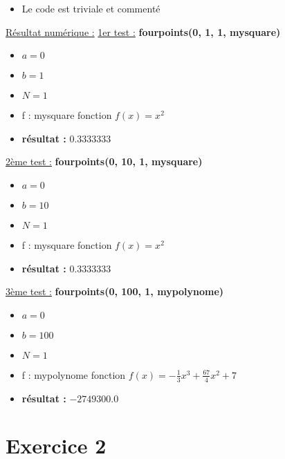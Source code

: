 \documentclass[12pt, letterpaper]{article}
\begin{document}
\begin{enumerate}
  \begin{itemize}
  \item Le code est triviale et commenté
  \end{itemize}

  \underline{Résultat numérique :} \newline
  \underline{1er test :} \textbf{fourpoints(0, 1, 1, mysquare)}

  \begin{itemize}
  \item $ a = 0 $
  \item $ b = 1 $
  \item $ N = 1 $
  \item f : mysquare fonction $f(x) = x^2$
  \item \textbf{résultat :} $0.3333333$
  \end{itemize}

  \underline{2ème test :} \textbf{fourpoints(0, 10, 1, mysquare)}

  \begin{itemize}
  \item $ a = 0 $
  \item $ b = 10 $
  \item $ N = 1 $
  \item f : mysquare fonction $f(x) = x^2$
  \item \textbf{résultat :} $0.3333333$
  \end{itemize}

  \underline{3ème test :} \textbf{fourpoints(0, 100, 1, mypolynome)}

  \begin{itemize}
  \item $ a = 0 $
  \item $ b = 100 $
  \item $ N = 1 $
  \item f : mypolynome fonction $f(x) = - \frac{1}{3} x^3 +
    \frac{67}{4} x^2 + 7$
  \item \textbf{résultat :} $-2749300.0$
  \end{itemize}

\end{enumerate}

\newpage

\section*{Exercice 2}
\end{document}
